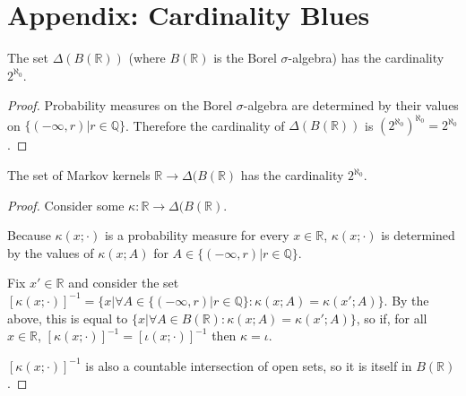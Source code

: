 \section{Appendix: Cardinality Blues}

\begin{lemma}
The set $\Delta(B(\mathbb{R}))$ (where $B(\mathbb{R})$ is the Borel $\sigma$-algebra) has the cardinality $2^{\aleph_0}$.
\end{lemma}

\begin{proof}
Probability measures on the Borel $\sigma$-algebra are determined by their values on $\{(-\infty,r)|r\in \mathbb{Q}\}$. Therefore the cardinality of $\Delta(B(\mathbb{R}))$ is $(2^{\aleph_0})^{\aleph_0}=2^{\aleph_0}$.
\end{proof}

\begin{lemma}
The set of Markov kernels $\mathbb{R}\to \Delta(B(\mathbb{R})$ has the cardinality $2^{\aleph_0}$.
\end{lemma}

\begin{proof}
Consider some $\kappa:\mathbb{R}\to \Delta(B(\mathbb{R})$.

Because $\kappa(x;\cdot)$ is a probability measure for every $x\in \mathbb{R}$, $\kappa(x;\cdot)$ is determined by the values of $\kappa(x;A)$ for $A\in \{(-\infty,r)|r\in \mathbb{Q}\}$.

Fix $x'\in \mathbb{R}$ and consider the set $[\kappa(x;\cdot)]^{-1} = \{x|\forall A\in \{(-\infty,r)|r\in \mathbb{Q}\}:\kappa(x;A) = \kappa(x';A)\}$. By the above, this is equal to $\{x|\forall A\in B(\mathbb{R}):\kappa(x;A) = \kappa(x';A)\}$, so if, for all $x\in \mathbb{R}$, $[\kappa(x;\cdot)]^{-1}=[\iota(x;\cdot)]^{-1}$ then $\kappa=\iota$. 

$[\kappa(x;\cdot)]^{-1}$ is also a countable intersection of open sets, so it is itself in $B(\mathbb{R})$.

\end{proof}